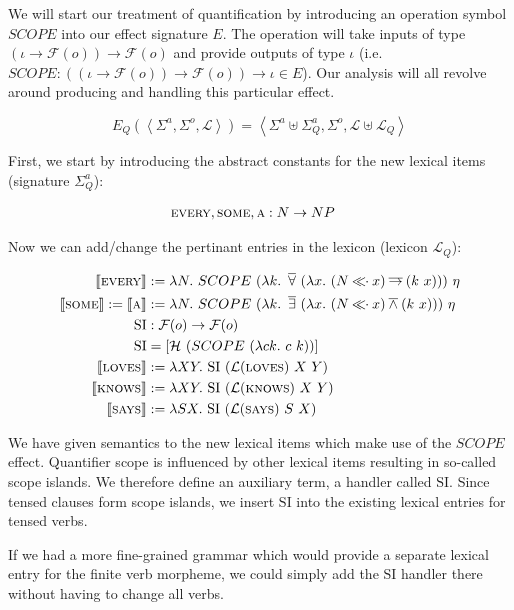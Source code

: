 We will start our treatment of quantification by introducing an operation
symbol $SCOPE$ into our effect signature $E$. The operation will take
inputs of type $(\iota \to \mathcal{F}(o)) \to \mathcal{F}(o)$ and provide
outputs of type $\iota$ (i.e.\ $SCOPE : ((\iota \to \mathcal{F}(o)) \to
\mathcal{F}(o)) \to \iota \in E$). Our analysis will all revolve around
producing and handling this particular effect.

$$
E_Q(\left< \Sigma^a, \Sigma^o, \mathcal{L} \right>) = \left< \Sigma^a \uplus \Sigma^a_Q, \Sigma^o, \mathcal{L} \uplus \mathcal{L}_Q \right>
$$

First, we start by introducing the abstract constants for the new lexical
items (signature $\Sigma^a_Q$):

\begin{align*}
  \textsc{every}, \textsc{some}, \textsc{a} &: N \to NP
\end{align*}

Now we can add/change the pertinant entries in the lexicon (lexicon $\mathcal{L}_Q$):

\begin{align*}
  \lex{every}{\lambda N.\ SCOPE\ (\lambda k.\ \dforall\ (\lambda x.\ (N \apl x) \dimpl (k\ x)))\ \eta} \\
  \sem{\abs{some}} := \sem{\abs{a}} &:= \lambda N.\ SCOPE\ (\lambda k.\ \dexists\ (\lambda x.\ (N \apl x) \dand (k\ x)))\ \eta \\
  \mathrm{SI} &: \mathcal{F}(o) \to \mathcal{F}(o) \\
  \mathrm{SI} &= [\mathcal{H}\ (SCOPE\ (\lambda c k.\ c\ k))] \\
  \lex{loves}{\lambda X Y.\ \mathrm{SI}\ (\mathcal{L}(\abs{loves})\ X\ Y)} \\
  \lex{knows}{\lambda X Y.\ \mathrm{SI}\ (\mathcal{L}(\abs{knows})\ X\ Y)} \\
  \lex{says}{\lambda S X.\ \mathrm{SI}\ (\mathcal{L}(\abs{says})\ S\ X)} \\
\end{align*}

We have given semantics to the new lexical items which make use of the
$SCOPE$ effect. Quantifier scope is influenced by other lexical items
resulting in so-called scope islands. We therefore define an auxiliary
term, a handler called $\mathrm{SI}$. Since tensed clauses form scope
islands, we insert $\mathrm{SI}$ into the existing lexical entries
for tensed verbs.

If we had a more fine-grained grammar which would provide a separate
lexical entry for the finite verb morpheme, we could simply add the
$\mathrm{SI}$ handler there without having to change all verbs.

